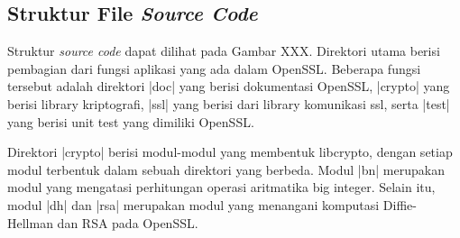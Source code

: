 %
%
%
%
%


\subsection{Struktur File \textit{Source Code}}

%


Struktur \textit{source code} dapat dilihat pada Gambar XXX. Direktori utama berisi pembagian dari fungsi aplikasi yang ada dalam OpenSSL. Beberapa fungsi tersebut adalah direktori |doc| yang berisi dokumentasi OpenSSL, |crypto| yang berisi library kriptografi, |ssl| yang berisi dari library komunikasi ssl, serta |test| yang berisi unit test yang dimiliki OpenSSL.

Direktori |crypto| berisi modul-modul yang membentuk libcrypto, dengan setiap modul terbentuk dalam sebuah direktori yang berbeda. Modul |bn| merupakan modul yang mengatasi perhitungan operasi aritmatika big integer. Selain itu, modul |dh| dan |rsa| merupakan modul yang menangani komputasi Diffie-Hellman dan RSA pada OpenSSL.

